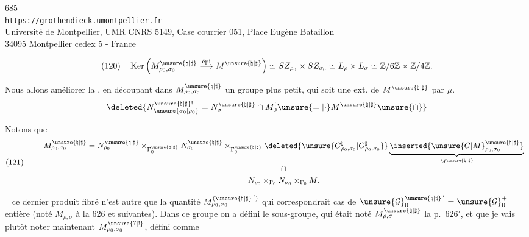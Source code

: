 
\begin{center}
685\\
\texttt{https://grothendieck.umontpellier.fr}\\
Université de Montpellier, UMR CNRS 5149, Case courrier 051, Place Eugène Bataillon\\
34095 Montpellier cedex 5 - France
\end{center}



\[
(120)\quad
\operatorname{Ker}\left(
M_{\rho_0,\sigma_0}^{\unsure{\natural|\sharp}}
\overset{\text{épi}}{\longrightarrow}M^{\unsure{\natural|\sharp}}
\right)
\simeq SZ_{\rho_0}\times SZ_{\sigma_0}
\simeq L_\rho\times L_\sigma
\simeq \mathbb Z/6\mathbb Z\times\mathbb Z/4\mathbb Z .
\]

Nous allons améliorer  la ,
en découpant dans $M_{\rho_0,\sigma_0}^{\unsure{\natural|\sharp}}$
un groupe  plus petit, qui soit une ext. de
$M^{\unsure{\natural|\sharp}}$ par $\mu$.
\[
\deleted{
N_{\unsure{\sigma_0|\rho_0}}^{\unsure{\natural|\sharp}!}
=N_{\sigma}^{\unsure{\natural|\sharp}}\cap M_0^!
\unsure{=|\cdot}M^{\unsure{\natural|\sharp}}\unsure{\cap}
}
\]

\unsure{(}

Notons que
\[
(121)\qquad
\begin{array}{c}
M_{\rho_0,\sigma_0}^{\unsure{\natural|\sharp}}
=N_{\rho_0}^{\unsure{\natural|\sharp}}
\times_{\Gamma_0^{\unsure{\natural|\sharp}}}
N_{\sigma_0}^{\unsure{\natural|\sharp}}
\times_{\Gamma_0^{\unsure{\natural|\sharp}}}
\deleted{\unsure{G_{\rho_0,\sigma_0}^{\natural}|G_{\rho_0,\sigma_0}^{\sharp}}}
\underbrace{\inserted{\unsure{G|M}_{\rho_0,\sigma_0}^{\unsure{\natural|\sharp}}}}
 _{M^{\unsure{\natural|\sharp}}}\\[5pt]
\cap\\[3pt]
N_{\rho_0}\times_{\Gamma_0}N_{\sigma_0}\times_{\Gamma_0}M .
\end{array}
\]

\  ce dernier produit fibré n'est autre que la
quantité $M_{\rho_0,\sigma_0}^{(\unsure{\natural|\sharp}\,')}$
qui correspondrait  cas
de $\unsure{\mathcal G}_0^{\unsure{\natural|\sharp}\,'}
=\unsure{\mathcal G}_0^+$  entière
(noté $M_{\rho,\sigma}$ à la  626 et suivantes).
Dans ce groupe on a défini le sous-groupe, qui était noté
$M_{\rho,\sigma}^{\unsure{\natural|\sharp}}$
 la p.\ $626'$,
et que je vais plutôt noter maintenant
$M_{\rho_0,\sigma_0}^{\unsure{?|!}}$, défini comme

